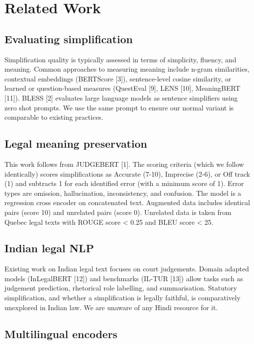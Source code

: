 \documentclass[conference]{IEEEtran}
\begin{document}
\section{Related Work}

\subsection{Evaluating simplification}

Simplification quality is typically assessed in terms of simplicity, fluency, and meaning. Common approaches to measuring meaning include n-gram similarities, contextual embeddings (BERTScore [3]), sentence-level cosine similarity, or learned or question-based measures (QuestEval [9], LENS [10], MeaningBERT [11]). BLESS [2] evaluates large language models as sentence simplifiers using zero shot prompts. We use the same prompt to ensure our normal variant is comparable to existing practices.

\subsection{Legal meaning preservation}

This work follows from JUDGEBERT [1]. The scoring criteria (which we follow identically) scores simplifications as Accurate (7-10), Imprecise (2-6), or Off track (1) and subtracts 1 for each identified error (with a minimum score of 1). Error types are omission, hallucination, inconsistency, and confusion. The model is a regression cross encoder on concatenated text. Augmented data includes identical pairs (score 10) and unrelated pairs (score 0). Unrelated data is taken from Quebec legal texts with ROUGE score < 0.25 and BLEU score < 25.

\subsection{Indian legal NLP}

Existing work on Indian legal text focuses on court judgements. Domain adapted models (InLegalBERT [12]) and benchmarks (IL-TUR [13]) allow tasks such as judgement prediction, rhetorical role labelling, and summarisation. Statutory simplification, and whether a simplification is legally faithful, is comparatively unexplored in Indian law. We are unaware of any Hindi resource for it.

\subsection{Multilingual encoders}
\end{document}
